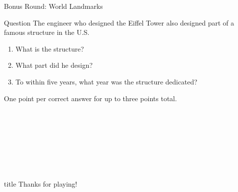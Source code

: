 \documentclass[11pt]{beamer}
\begin{document}
\begin{frame}[t]{Bonus Round: World Landmarks}
\vspace{0.5em}
\begin{block}{Question}
The engineer who designed the Eiffel Tower also designed part of a famous structure in the U.S. 
\begin{enumerate}
\item What is the structure?
\item What part did he design?
\item To within five years, what year was the structure dedicated?
\end{enumerate}
One point per correct answer for up to three points total.
\end{block}
\end{frame}
    

\section*{\ }
\subsection*{\ }
\begingroup{}
\begin{frame}
\vfill{}
\centering{}
\begin{beamercolorbox}[sep=8pt,center,shadow=true,rounded=true]{title}
Thanks for playing!\par%
\end{beamercolorbox}
\vfill{}
\end{frame}
\endgroup{}
\end{document}
